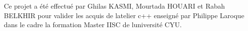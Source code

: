 Ce projet a été effectué par Ghilas KASMI, Mourtada HOUARI et Rabah BELKHIR pour valider les acquis de l\textquotesingle{}atelier c++ enseigné par Philippe Laroque dans le cadre la formation Master IISC de l\textquotesingle{}université CYU. ~\newline
 